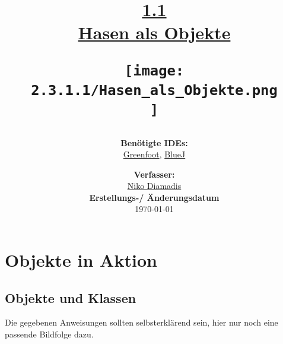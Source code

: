 \documentclass[]{scrartcl}   %
\begin{document}
\title{\huge{\href{https://inf-schule.de/programmierung/oopjava/klassen/grundbegriffe}{1.1\\Hasen als Objekte}}\\
\vspace{0.5cm}
\begin{figure}[ht]
	\centering
	\texttt{[image: 2.3.1.1/Hasen\_als\_Objekte.png]}
\end{figure}
\vspace{2cm}}

\author{\textbf{Benötigte IDEs:}\\
\href{https://www.greenfoot.org/}{Greenfoot}, \href{https://www.bluej.org/}{BlueJ}
\vspace{2cm}}

\date{\textbf{Verfasser:}\\
\href{https://nikothegreek.jimdofree.com/}{Niko Diamadis}\\
\vspace{0.5cm}
\textbf{Erstellungs-/ Änderungsdatum}\\
\today\enlargethispage{4cm}}

\doublespacing

\maketitle\thispagestyle{empty}

\cleardoublepage

\setcounter{page}{1}
\tableofcontents


\newpage
{}  %

\section{Objekte in Aktion}

\subsection{Objekte und Klassen}
Die gegebenen Anweisungen sollten selbsterklärend sein, hier nur noch eine passende Bildfolge dazu.
\end{document}
